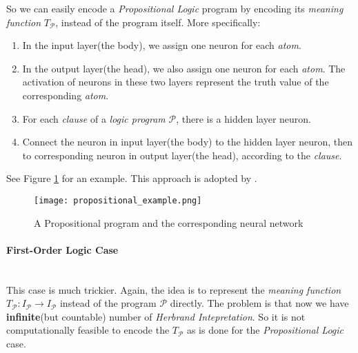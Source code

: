 \documentclass[letterpaper,10pt]{article}
\theoremstyle{definition}
\begin{document}
So we can easily encode a \emph{Propositional Logic} program by encoding its \emph{meaning function} $T_{\mathcal{P}}$, instead of the program itself. More specifically:

\begin{enumerate}[noitemsep]
\item In the input layer(the body), we assign one neuron for each \emph{atom}.
\item In the output layer(the head), we also assign one neuron for each \emph{atom}. The activation of neurons in these two layers represent the truth value of the corresponding \emph{atom}.
\item For each \emph{clause} of a \emph{logic program} $\mathcal{P}$, there is a hidden layer neuron.
\item Connect the neuron in input layer(the body) to the hidden layer neuron, then to corresponding neuron in output layer(the head), according to the \emph{clause}.
\end{enumerate}

See Figure \ref{fig:pp_example} for an example. This approach is adopted by \cite{holldobler1991towards}.

\begin{figure}[h]
\centering
\texttt{[image: propositional\_example.png]}
\caption{A Propositional program and the corresponding neural network\protect\footnotemark}
\label{fig:pp_example}
\end{figure}


\paragraph{First-Order Logic Case}\label{fol_sec}\leavevmode\\

This case is much trickier. Again, the idea is to represent the \emph{meaning
function} $T_{\mathcal{P}}: I_{\mathcal{P}} \rightarrow I_{\mathcal{P}}$ instead of the program $\mathcal{P}$ directly. The
problem is that now we have \textbf{infinite}(but countable) number of
\emph{Herbrand Intepretation}. So it is not computationally feasible to encode
the $T_{\mathcal{P}}$ as is done for the \emph{Propositional Logic} case.
\end{document}
